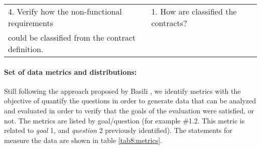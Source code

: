 \documentclass[runningheads,a4paper]{llncs}
\begin{document}
\begin{table}
\begin{tabular}{|l|l|}
\hline

4. Verify how the non-functional requirements & 1. How are classified the
contracts? \\ 
could be classified from the contract definition. &  \\

\hline
\hline

\hline


\end{tabular}

\end{table}


\paragraph{Set of data metrics and distributions:} Still following the approach
proposed by Basili \cite{basili:1985}, we identify metrics with the objective of quantify the questions in order to generate data that can be
analyzed and evaluated in order to verify that the goals of the evaluation
were satisfied, or not. The metrics are listed by goal/question (for
example \#1.2. This metric is related to \textit{goal} 1, and \textit{question}
2 previously identified). The statements for measure the data are
shown in table \ref{tab8:metrics}.
\end{document}
